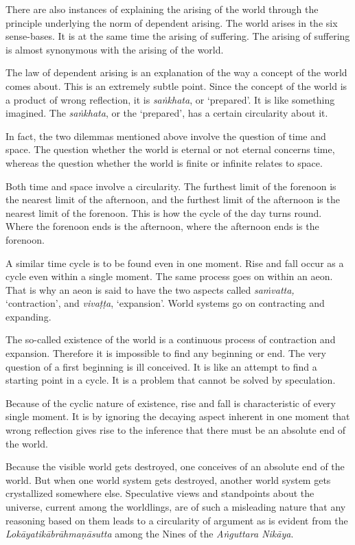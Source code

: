 There are also instances of explaining the arising of the world through the principle underlying the norm of dependent arising. The world arises in the six sense-bases. It is at the same time the arising of suffering. The arising of suffering is almost synonymous with the arising of the world.

The law of dependent arising is an explanation of the way a concept of the world comes about. This is an extremely subtle point. Since the concept of the world is a product of wrong reflection, it is \emph{saṅkhata}, or `prepared'. It is like something imagined. The \emph{saṅkhata}, or the `prepared', has a certain circularity about it.

In fact, the two dilemmas mentioned above involve the question of time and space. The question whether the world is eternal or not eternal concerns time, whereas the question whether the world is finite or infinite relates to space.

Both time and space involve a circularity. The furthest limit of the forenoon is the nearest limit of the afternoon, and the furthest limit of the afternoon is the nearest limit of the forenoon. This is how the cycle of the day turns round. Where the forenoon ends is the afternoon, where the afternoon ends is the forenoon.

A similar time cycle is to be found even in one moment. Rise and fall occur as a cycle even within a single moment. The same process goes on within an aeon. That is why an aeon is said to have the two aspects called \emph{saṁvatta,} `contraction', and \emph{vivaṭṭa}, `expansion'. World systems go on contracting and expanding.

The so-called existence of the world is a continuous process of contraction and expansion. Therefore it is impossible to find any beginning or end. The very question of a first beginning is ill conceived. It is like an attempt to find a starting point in a cycle. It is a problem that cannot be solved by speculation.

Because of the cyclic nature of existence, rise and fall is characteristic of every single moment. It is by ignoring the decaying aspect inherent in one moment that wrong reflection gives rise to the inference that there must be an absolute end of the world.

Because the visible world gets destroyed, one conceives of an absolute end of the world. But when one world system gets destroyed, another world system gets crystallized somewhere else. Speculative views and standpoints about the universe, current among the worldlings, are of such a misleading nature that any reasoning based on them leads to a circularity of argument as is evident from the \emph{Lokāyatikābrāhmaṇāsutta} among the Nines of the \emph{Aṅguttara Nikāya}.

